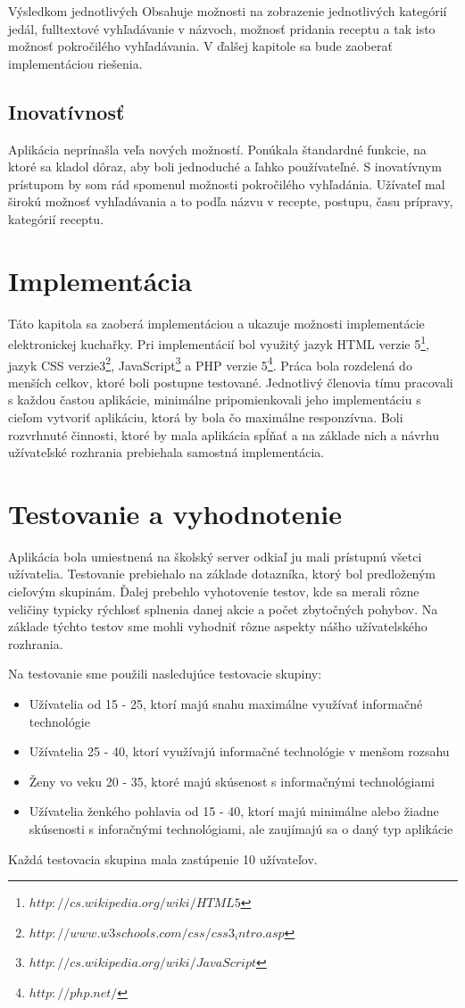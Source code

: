 \documentclass[12pt,a4paper,titlepage,final]{article}
\begin{document}
Výsledkom jednotlivých Obsahuje možnosti na zobrazenie jednotlivých kategórií jedál, fulltextové vyhľadávanie v názvoch, možnosť pridania receptu  a tak isto možnosť pokročilého vyhľadávania. V ďalšej kapitole sa bude zaoberať implementáciou riešenia. 

\subsection{Inovatívnosť}
Aplikácia neprínašla veľa nových možností. Ponúkala štandardné funkcie, na ktoré sa kladol dôraz, aby boli jednoduché a ľahko používateľné. S inovatívnym prístupom by som rád spomenul možnosti pokročilého vyhľadánia. Užívateľ mal širokú možnosť vyhľadávania a to podľa názvu v recepte, postupu, času prípravy, kategórií receptu.



\section{Implementácia}
Táto kapitola sa zaoberá implementáciou a ukazuje možnosti implementácie elektronickej kuchařky. Pri implementácií bol využitý jazyk HTML verzie 5\footnote{$http://cs.wikipedia.org/wiki/HTML5$}, jazyk CSS verzie3\footnote{$http://www.w3schools.com/css/css3_intro.asp$}, JavaScript\footnote{$http://cs.wikipedia.org/wiki/JavaScript$} a PHP verzie 5\footnote{$http://php.net/$}. Práca bola rozdelená do menších celkov, ktoré boli postupne testované. Jednotlivý členovia tímu pracovali s každou častou aplikácie, minimálne pripomienkovali jeho implementáciu s cieľom vytvoriť aplikáciu, ktorá by bola čo maximálne responzívna. Boli rozvrhnuté činnosti, ktoré by mala aplikácia spĺňať a na základe nich a návrhu užívateľské rozhrania prebiehala samostná implementácia.


\section{Testovanie a vyhodnotenie}
Aplikácia bola umiestnená na školský server odkiaľ ju mali prístupnú všetci užívatelia. Testovanie prebiehalo na základe dotazníka, ktorý bol predloženým cieľovým skupinám. Ďalej prebehlo vyhotovenie testov, kde sa merali rôzne veličiny typicky rýchlosť splnenia danej akcie a počet zbytočných pohybov. Na základe týchto testov sme mohli vyhodniť rôzne aspekty nášho užívatelského rozhrania. 

Na testovanie sme použili nasledujúce testovacie skupiny:
\begin{itemize}
\item Užívatelia od 15 - 25, ktorí majú snahu maximálne využívať informačné technológie
\item Užívatelia 25 - 40, ktorí využívajú informačné technológie v menšom rozsahu
\item Ženy vo veku 20 - 35, ktoré majú skúsenost s informačnými technológiami
\item Užívatelia ženkého pohlavia od 15 - 40, ktorí majú minimálne alebo žiadne skúsenosti s inforačnými technológiami, ale zaujímajú sa o daný typ aplikácie
\end{itemize}
Každá testovacia skupina mala zastúpenie 10 užívateľov.
\end{document}
